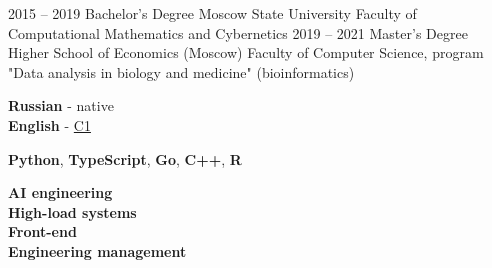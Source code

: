 \documentclass[9pt]{developercv} %
\begin{document}


\begin{entrylist}
	\entry
		{2015 -- 2019}
		{Bachelor's Degree}
		{Moscow State University}
		{Faculty of Computational Mathematics and Cybernetics}
	\entry
		{2019 -- 2021}
		{Master's Degree}
		{Higher School of Economics (Moscow)}
		{Faculty of Computer Science, program "Data analysis in biology and medicine" (bioinformatics)}
\end{entrylist}


\begin{minipage}[t]{0.3\textwidth} %
	\vspace{-\baselineskip} %

	
	\textbf{Russian} - native\\
	\textbf{English} - {\href{https://cert.efset.org/en/1W9jFp}{C1}}\\
\end{minipage}
\hfill %
\begin{minipage}[t]{0.3\textwidth} %
	\vspace{-\baselineskip} %
	
	
	\textbf{Python}, \textbf{TypeScript}, \textbf{Go}, \textbf{C++}, \textbf{R}
\end{minipage}
\hfill
\begin{minipage}[t]{0.2\textwidth}
	\vspace{-\baselineskip} %


	\textbf{AI engineering}\\
	\textbf{High-load systems}\\
	\textbf{Front-end}\\
	\textbf{Engineering management}\\
\end{minipage}
\end{document}
